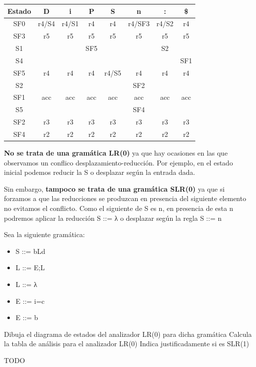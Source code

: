 \documentclass[nochap]{apuntes}
\begin{document}
\begin{problem}
\ppart
\begin{tabular}{| c | c | c | c | c | c | c | c | }
\hline
Estado & D & i & P & S & n & : & \$\\
\hline
SF0 & r4/S4 & r4/S1 & r4 & r4 & r4/SF3 & r4/S2 & r4\\
\hline
SF3 & r5 & r5 & r5 & r5 & r5 & r5  & r5\\
\hline
S1 & & & SF5 & & & S2 &\\
\hline
S4 & & & & & &  & SF1\\
\hline
SF5 & r4 & r4 & r4 & r4/S5 & r4 & r4 & r4\\
\hline
S2 & & & & & SF2 & &\\
\hline
SF1 & acc & acc & acc & acc & acc & acc & acc\\
\hline
S5 & & & & & SF4 & &\\
\hline
SF2 & r3 & r3 & r3 & r3 & r3 & r3 & r3\\
\hline
SF4 & r2 & r2 & r2 & r2 & r2 & r2 & r2\\
\hline
\end{tabular}
\ppart \textbf{No se trata de una gramática LR(0)} ya que hay ocasiones en las que observamos un conflico desplazamiento-reducción. Por ejemplo, en el estado inicial podemos reducir la S o desplazar según la entrada dada.

Sin embargo, \textbf{tampoco se trata de una gramática SLR(0)} ya que si forzamos a que las reducciones se produzcan en presencia del siguiente elemento no evitamos el conflicto. Como el siguiente de S es n, en presencia de esta n podremos aplicar la reducción S ::= λ o desplazar según la regla S ::= n
\end{problem}

\begin{problem}
Sea la siguiente gramática:
\begin{itemize}
\item S ::= bLd
\item L ::= E;L
\item L ::= λ
\item E ::= i=c
\item E ::= b
\end{itemize}
\ppart Dibuja el diagrama de estados del analizador LR(0) para dicha gramática
\ppart Calcula la tabla de análisis para el analizador LR(0)
\ppart Indica justificadamente si es SLR(1)

\solution
TODO
\end{problem}
\end{document}
